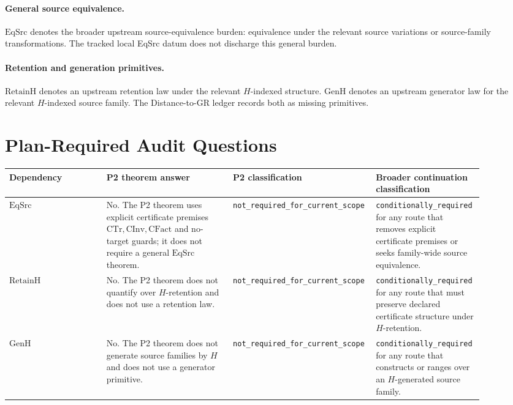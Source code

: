 \documentclass[11pt]{article}
\newcommand{\EqSrc}{\mathrm{EqSrc}}
\newcommand{\RetainH}{\mathrm{RetainH}}
\newcommand{\GenH}{\mathrm{GenH}}
\newcommand{\CTr}{\mathrm{CTr}}
\newcommand{\CInv}{\mathrm{CInv}}
\newcommand{\CFact}{\mathrm{CFact}}
\begin{document}
\paragraph{General source equivalence.}
\(\EqSrc\) denotes the broader upstream source-equivalence burden: equivalence
under the relevant source variations or source-family transformations. The
tracked local EqSrc datum does not discharge this general burden.

\paragraph{Retention and generation primitives.}
\(\RetainH\) denotes an upstream retention law under the relevant \(H\)-indexed
structure. \(\GenH\) denotes an upstream generator law for the relevant
\(H\)-indexed source family. The Distance-to-GR ledger records both as missing
primitives.

\section*{Plan-Required Audit Questions}

\begin{longtable}{p{0.20\linewidth}p{0.26\linewidth}p{0.22\linewidth}p{0.22\linewidth}}
\textbf{Dependency} & \textbf{P2 theorem answer} &
\textbf{P2 classification} & \textbf{Broader continuation classification} \\
\hline
\(\EqSrc\) &
No. The P2 theorem uses explicit certificate premises
\(\CTr,\CInv,\CFact\) and no-target guards; it does not require a general
\(\EqSrc\) theorem. &
\texttt{not\_required\_for\_current\_scope} &
\texttt{conditionally\_required} for any route that removes explicit
certificate premises or seeks family-wide source equivalence. \\
\(\RetainH\) &
No. The P2 theorem does not quantify over \(H\)-retention and does not use a
retention law. &
\texttt{not\_required\_for\_current\_scope} &
\texttt{conditionally\_required} for any route that must preserve declared
certificate structure under \(H\)-retention. \\
\(\GenH\) &
No. The P2 theorem does not generate source families by \(H\) and does not use
a generator primitive. &
\texttt{not\_required\_for\_current\_scope} &
\texttt{conditionally\_required} for any route that constructs or ranges over
an \(H\)-generated source family. \\
\end{longtable}
\end{document}
